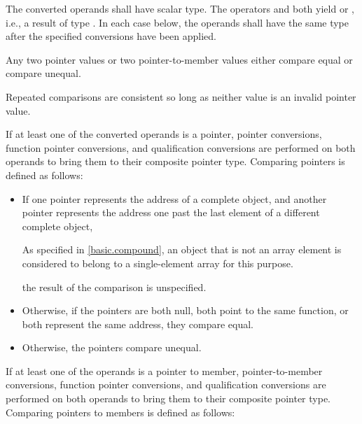 \pnum
The converted operands shall have scalar type. The operators
\tcode{==} and \tcode{!=} both yield  or , i.e., a
result of type . In each case below, the operands shall have the
same type after the specified conversions have been applied.

\pnum
Any two pointer values or two pointer-to-member values
either compare equal or compare unequal.
\begin{note}
Repeated comparisons are consistent
so long as neither value is an invalid pointer value.
\end{note}

\pnum
{}%
%
If at least one of the converted operands is a pointer,
pointer conversions,
function pointer conversions, and
qualification conversions
are performed on both operands to bring them to their composite pointer type.
Comparing pointers is defined as follows:

\begin{itemize}
\item
If one pointer represents the address of a complete object, and another
pointer represents the address one past the last element of a different
complete object,
\begin{footnote}
As specified in \ref{basic.compound},
an object that is not an array element is
considered to belong to a single-element array for this purpose.
\end{footnote}
the result of the comparison is unspecified.
\item
Otherwise, if the pointers are both null, both point to the same
%
function, or both represent the same address,
they compare equal.
\item
Otherwise, the pointers compare unequal.
\end{itemize}

\pnum
If at least one of the operands is a pointer to member,
pointer-to-member conversions,
function pointer conversions, and
qualification conversions
are performed on both operands to bring them to
their composite pointer type.
Comparing pointers to members is defined as follows:

